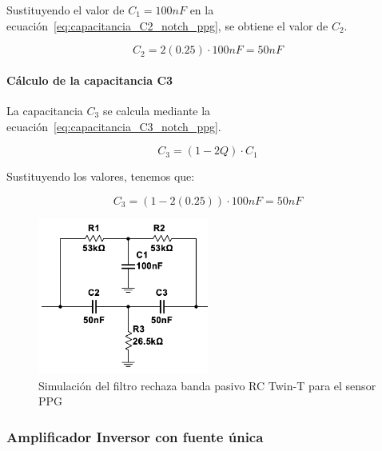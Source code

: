         Sustituyendo el valor de $C_1 = 100 nF$ en la ecuación~\ref{eq:capacitancia_C2_notch_ppg}, se obtiene el valor de $C_2$.

        \begin{equation}
            C_2 = 2(0.25) \cdot 100 nF = 50 nF
        \end{equation}

        \paragraph{Cálculo de la capacitancia C3}

        La capacitancia $C_3$ se calcula mediante la ecuación~\ref{eq:capacitancia_C3_notch_ppg}.

        \begin{equation}
            \label{eq:capacitancia_C3_notch_ppg}
            C_3 = (1 - 2Q) \cdot C_1
        \end{equation}

        Sustituyendo los valores, tenemos que:

        \begin{equation}
            C_3 = (1 - 2(0.25)) \cdot 100 nF = 50 nF
        \end{equation}

        \begin{figure}[H]
            \centering
            \includegraphics[width=0.5\textwidth]{img/Desarrollo/multisim_rechazaBandas.png}
            \caption[Simulación del filtro rechaza banda pasivo RC Twin-T para el sensor PPG.]{Simulación del filtro rechaza banda pasivo RC Twin-T para el sensor PPG\footnotemark}
            \label{fig:Simulacion_Filtro_Rechaza_Banda_PPG}
        \end{figure}

        \subsubsection{Amplificador Inversor con fuente única}
